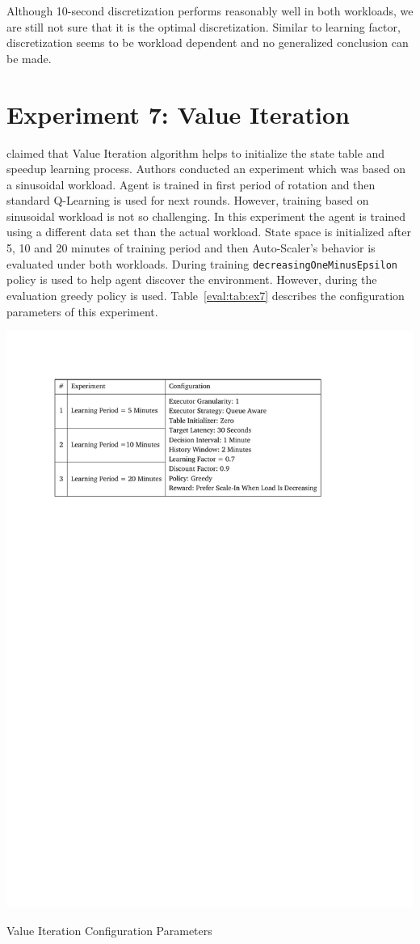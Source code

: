 Although 10-second discretization performs reasonably well in both workloads, we are still not sure that it is the optimal discretization. Similar to learning factor, discretization seems to be workload dependent and no generalized conclusion can be made.

\clearpage
\section{Experiment 7: Value Iteration}
\textcite{dutreilh:hal-01122123} claimed that Value Iteration algorithm helps to initialize the state table and speedup learning process. Authors conducted an experiment which was based on a sinusoidal workload. Agent is trained in first period of rotation and then standard Q-Learning is used for next rounds. However, training based on sinusoidal workload is not so challenging. In this experiment the agent is trained using a different data set than the actual workload. State space is initialized after 5, 10 and 20 minutes of training period and then Auto-Scaler's behavior is evaluated under both workloads. During training \lstinline|decreasingOneMinusEpsilon| policy is used to help agent discover the environment. However, during the evaluation greedy policy is used. Table~\ref{eval:tab:ex7} describes the configuration parameters of this experiment.
\begin{table}[h]
    \includegraphics[clip,trim=2.4cm 21.18cm 4.65cm 2.5cm]{tables/ex7.pdf}
    \centering
    \caption{Value Iteration Configuration Parameters}
    \label{eval:tab:ex7}
\end{table}

